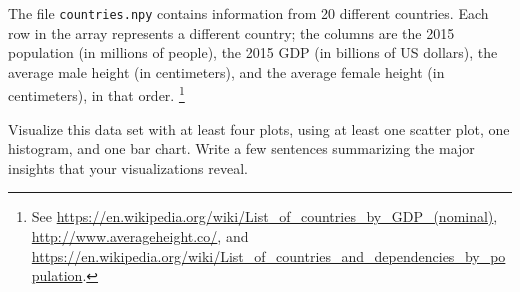 \begin{problem}
The file \texttt{countries.npy} contains information from 20 different countries.
Each row in the array represents a different country; the columns are the 2015 population (in millions of people), the 2015 GDP (in billions of US dollars), the average male height (in centimeters), and the average female height (in centimeters), in that order.%
\footnote{
See \url{https://en.wikipedia.org/wiki/List_of_countries_by_GDP_(nominal)}, \url{http://www.averageheight.co/}, and \url{https://en.wikipedia.org/wiki/List_of_countries_and_dependencies_by_population}.}

Visualize this data set with at least four plots, using at least one scatter plot, one histogram, and one bar chart.
Write a few sentences summarizing the major insights that your visualizations reveal.
\end{problem}

